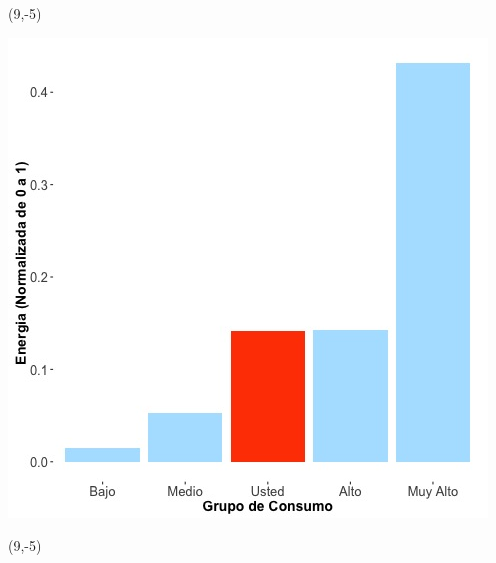 \documentclass{article}\usepackage[]{graphicx}\usepackage[]{color}
\newenvironment{knitrout}{}{} %
\begin{document}
 \begin{textblock}{1}(9,-5)
\begin{minipage}{20em}
\begingroup

\endgroup
\end{minipage}
\end{textblock}


\begin{knitrout}
\color{fgcolor}
\includegraphics[scale=0.65]{figure/A3_neighbor_plot} 
\end{knitrout}

 \begin{textblock}{1}(9,-5)
\begin{minipage}{20em}
\begingroup

\endgroup
\end{minipage}
\end{textblock}
\end{document}
